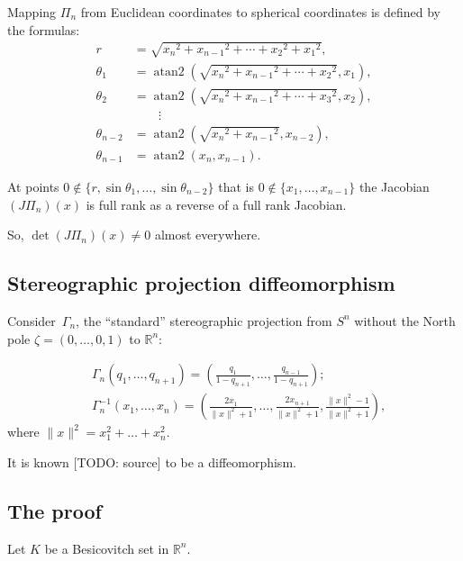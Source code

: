 \documentclass{amsart}
\begin{document}
Mapping $\Pi_n$ from Euclidean coordinates to spherical coordinates is defined by the formulas:
\[
\begin{aligned}r&={\textstyle {\sqrt {{x_{n}}^{2}+{x_{n-1}}^{2}+\cdots +{x_{2}}^{2}+{x_{1}}^{2}}}},\\\theta _{1}&=\operatorname {atan2} \left({\textstyle {\sqrt {{x_{n}}^{2}+{x_{n-1}}^{2}+\cdots +{x_{2}}^{2}}}},x_{1}\right),\\\theta _{2}&=\operatorname {atan2} \left({\textstyle {\sqrt {{x_{n}}^{2}+{x_{n-1}}^{2}+\cdots +{x_{3}}^{2}}}},x_{2}\right),\\&\qquad \vdots \\\theta _{n-2}&=\operatorname {atan2} \left({\textstyle {\sqrt {{x_{n}}^{2}+{x_{n-1}}^{2}}}},x_{n-2}\right),\\\theta _{n-1}&=\operatorname {atan2} \left(x_{n},x_{n-1}\right).\end{aligned}
\]  

At points $0\notin\{r,\sin\theta_1,\dots,\sin\theta_{n-2}\}$ that is $0\notin\{x_1,\dots,x_{n-1}\}$ the Jacobian $(J\Pi_n)(x)$
is full rank as a reverse of a full rank Jacobian.

So, $\det (J\Pi_n)(x)\ne 0$ almost everywhere.

\subsection{Stereographic projection diffeomorphism}

Consider~$\Gamma_n$, the ``standard'' stereographic projection from $S^n$ without the North pole $\zeta=(0,\dots,0,1)$ to $\mathbb{R}^n$:

\begin{align*}
&\Gamma_n(q_1,\dots,q_{n+1}) = \left(\frac{q_1}{1-q_{n+1}},\dots,\frac{q_{n-1}}{1-q_{n+1}}\right);\\
&\Gamma_n^{-1}(x_1,\dots,x_n) = \left(\frac{2x_1}{\lVert x\rVert^2+1},\dots,\frac{2x_{n+1}}{\lVert x\rVert^2+1},\frac{\lVert x\rVert^2-1}{\lVert x\rVert^2+1}\right),
\end{align*}
where $\lVert x\rVert^2 = x_1^2+\dots+x_n^2$.

It is known [TODO: source] to be a diffeomorphism.

\subsection{The proof}

Let $K$ be a Besicovitch set in $\mathbb{R}^n$.
\end{document}
